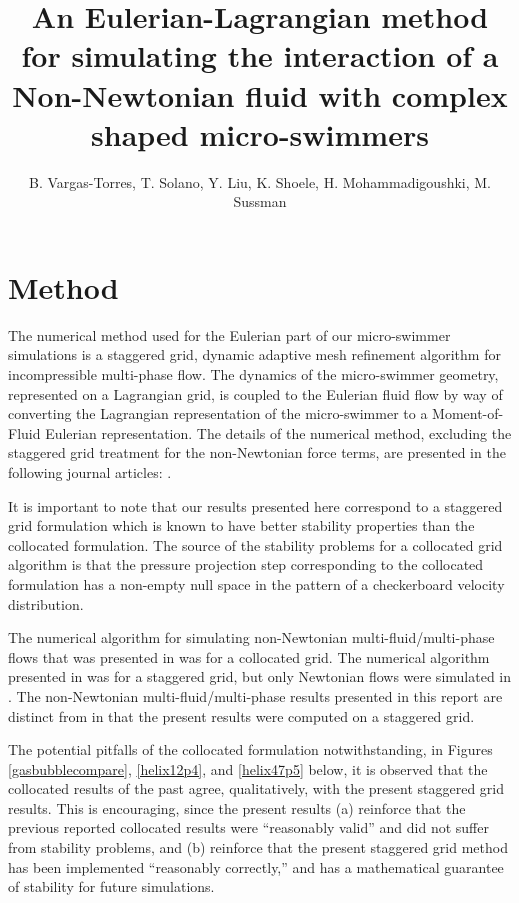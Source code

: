 \documentclass[]{article}
\title{An Eulerian-Lagrangian method for simulating the interaction of a 
 Non-Newtonian fluid with complex shaped micro-swimmers}
\author{B. Vargas-Torres,
   T. Solano, Y. Liu, K. Shoele, H. Mohammadigoushki, M. Sussman}
\begin{document}
\maketitle
\vspace*{-10mm}
\section{Method} 
The numerical method used for the Eulerian part of
our micro-swimmer simulations is a staggered
grid, dynamic adaptive mesh refinement algorithm for 
incompressible multi-phase flow.  
The dynamics of the micro-swimmer geometry, represented on a 
Lagrangian grid, is coupled to the Eulerian fluid flow by way of converting
the Lagrangian representation of the micro-swimmer to a
Moment-of-Fluid Eulerian representation.  The details of the numerical 
method, excluding the staggered grid treatment for the 
non-Newtonian force terms,
are presented in the following journal articles: 
\cite{dyadechko2005moment,ArientiSussman2014,peihierarchical,OHTA201966}.

It is important to note that our results presented here
correspond to a staggered grid 
formulation which is known to have better stability properties than the
collocated formulation\cite{rhie1983numerical}.  
The source of the stability problems for a collocated grid algorithm
is that the pressure projection step corresponding
to the collocated formulation has a non-empty null space in the pattern of
a checkerboard velocity distribution.

The numerical algorithm
for simulating non-Newtonian multi-fluid/multi-phase flows that was
presented in \cite{OHTA201966} was for a collocated grid.  The numerical
algorithm presented in \cite{peihierarchical} was for a staggered grid,
but only Newtonian flows were simulated in \cite{peihierarchical}.
The non-Newtonian multi-fluid/multi-phase results presented in 
this report are distinct from \cite{OHTA201966}
in that the present results were computed on a staggered grid.

The potential pitfalls of the collocated formulation notwithstanding,
in Figures \ref{gasbubblecompare}, \ref{helix12p4}, and
\ref{helix47p5} below, it is observed that the collocated results of the
past agree, qualitatively, with the present staggered grid results.  This
is encouraging, since the present results (a) reinforce that the previous 
reported collocated results were ``reasonably valid'' and did 
not suffer from stability 
problems, and (b) reinforce that the present staggered grid method has 
been implemented ``reasonably correctly,'' and has a mathematical guarantee of 
stability\cite{GUITTET2015215} for future simulations.
\end{document}
